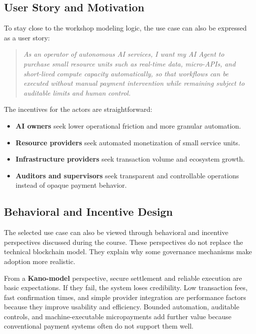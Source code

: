 \documentclass[12pt,a4paper,oneside]{article}
\theoremstyle{definition}
\theoremstyle{plain}
\begin{document}
\subsection{User Story and Motivation}

To stay close to the workshop modeling logic, the use case can also be expressed as a user story:

\begin{quote}
\textit{As an operator of autonomous AI services, I want my AI Agent to purchase small resource units such as real-time data, micro-APIs, and short-lived compute capacity automatically, so that workflows can be executed without manual payment intervention while remaining subject to auditable limits and human control.}
\end{quote}

The incentives for the actors are straightforward:

\begin{itemize}[leftmargin=1.2cm]
\item \textbf{AI owners} seek lower operational friction and more granular automation.
\item \textbf{Resource providers} seek automated monetization of small service units.
\item \textbf{Infrastructure providers} seek transaction volume and ecosystem growth.
\item \textbf{Auditors and supervisors} seek transparent and controllable operations instead of opaque payment behavior.
\end{itemize}

\subsection{Behavioral and Incentive Design}

The selected use case can also be viewed through behavioral and incentive perspectives discussed during the course. These perspectives do not replace the technical blockchain model. They explain why some governance mechanisms make adoption more realistic.

From a \textbf{Kano-model} perspective, secure settlement and reliable execution are basic expectations. If they fail, the system loses credibility. Low transaction fees, fast confirmation times, and simple provider integration are performance factors because they improve usability and efficiency. Bounded automation, auditable controls, and machine-executable micropayments add further value because conventional payment systems often do not support them well.
\end{document}
